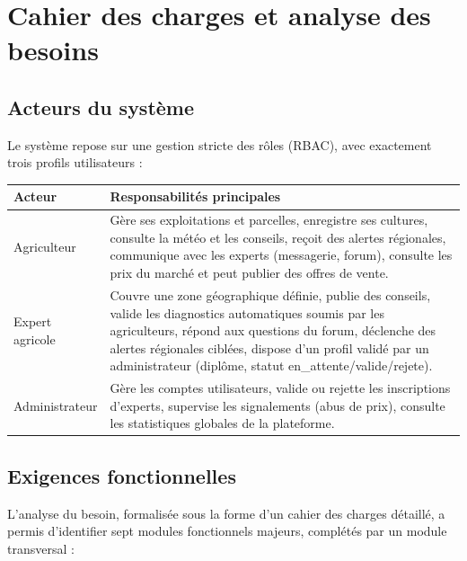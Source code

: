 \documentclass[12pt,a4paper]{report}
\begin{document}
\chapter{Cahier des charges et analyse des besoins}
\label{chap:cdc}

\section{Acteurs du système}

Le système repose sur une gestion stricte des rôles (RBAC), avec exactement trois profils utilisateurs :

\begin{longtable}{p{3.2cm}p{11cm}}
\toprule
\textbf{Acteur} & \textbf{Responsabilités principales} \\
\midrule
\endhead
Agriculteur & Gère ses exploitations et parcelles, enregistre ses cultures, consulte la météo et les conseils, reçoit des alertes régionales, communique avec les experts (messagerie, forum), consulte les prix du marché et peut publier des offres de vente. \\
Expert agricole & Couvre une zone géographique définie, publie des conseils, valide les diagnostics automatiques soumis par les agriculteurs, répond aux questions du forum, déclenche des alertes régionales ciblées, dispose d'un profil validé par un administrateur (diplôme, statut en\_attente/valide/rejete). \\
Administrateur & Gère les comptes utilisateurs, valide ou rejette les inscriptions d'experts, supervise les signalements (abus de prix), consulte les statistiques globales de la plateforme. \\
\bottomrule
\end{longtable}

\section{Exigences fonctionnelles}

L'analyse du besoin, formalisée sous la forme d'un cahier des charges détaillé, a permis d'identifier sept modules fonctionnels majeurs, complétés par un module transversal :
\end{document}
